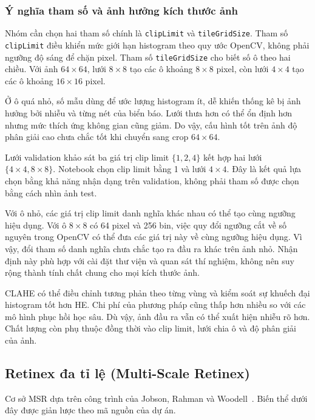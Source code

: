\subsubsection{Ý nghĩa tham số và ảnh hưởng kích thước ảnh}
Nhóm cần chọn hai tham số chính là \texttt{clipLimit} và \texttt{tileGridSize}. Tham số \texttt{clipLimit} điều khiển mức giới hạn histogram theo quy ước OpenCV, không phải ngưỡng độ sáng để chặn pixel. Tham số \texttt{tileGridSize} cho biết số ô theo hai chiều. Với ảnh $64\times64$, lưới $8\times8$ tạo các ô khoảng $8\times8$ pixel, còn lưới $4\times4$ tạo các ô khoảng $16\times16$ pixel.

Ở ô quá nhỏ, số mẫu dùng để ước lượng histogram ít, dễ khiến thống kê bị ảnh hưởng bởi nhiễu và từng nét của biển báo. Lưới thưa hơn có thể ổn định hơn nhưng mức thích ứng không gian cũng giảm. Do vậy, cấu hình tốt trên ảnh độ phân giải cao chưa chắc tốt khi chuyển sang crop $64\times64$.

Lưới validation khảo sát ba giá trị clip limit $\{1,2,4\}$ kết hợp hai lưới $\{4\times4,8\times8\}$. Notebook chọn clip limit bằng 1 và lưới $4\times4$. Đây là kết quả lựa chọn bằng khả năng nhận dạng trên validation, không phải tham số được chọn bằng cách nhìn ảnh test.

Với ô nhỏ, các giá trị clip limit danh nghĩa khác nhau có thể tạo cùng ngưỡng hiệu dụng. Với ô $8\times8$ có 64 pixel và 256 bin, việc quy đổi ngưỡng cắt về số nguyên trong OpenCV có thể đưa các giá trị này về cùng ngưỡng hiệu dụng. Vì vậy, đổi tham số danh nghĩa chưa chắc tạo ra đầu ra khác trên ảnh nhỏ. Nhận định này phù hợp với cài đặt thư viện và quan sát thí nghiệm, không nên suy rộng thành tính chất chung cho mọi kích thước ảnh.

CLAHE có thể điều chỉnh tương phản theo từng vùng và kiểm soát sự khuếch đại histogram tốt hơn HE. Chi phí của phương pháp cũng thấp hơn nhiều so với các mô hình phục hồi học sâu. Dù vậy, ảnh đầu ra vẫn có thể xuất hiện nhiễu rõ hơn. Chất lượng còn phụ thuộc đồng thời vào clip limit, lưới chia ô và độ phân giải của ảnh.

\subsection{Retinex đa tỉ lệ (Multi-Scale Retinex)}
Cơ sở MSR dựa trên công trình của Jobson, Rahman và Woodell~\cite{msr_original}. Biến thể dưới đây được giản lược theo mã nguồn của dự án.
